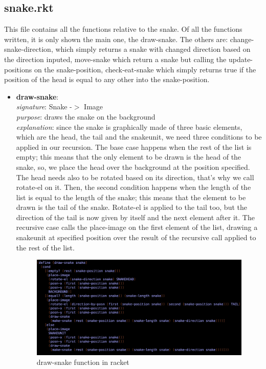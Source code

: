 \documentclass{article}
\begin{document}
	\pagebreak
	
	\subsection{snake.rkt}
	This file contains all the functions relative to the snake. Of all the functions written, it is only shown the main one, the draw-snake. The others are: change-snake-direction, which simply returns a snake with changed direction based on the direction inputed, move-snake which return a snake but calling the update-positions on the snake-position, check-eat-snake which simply returns true if the position of the head is equal to any other into the snake-position.
	\begin{itemize}
		\item \textbf{draw-snake}: \\
			\emph{signature}: Snake -$>$ Image \\
			\emph{purpose}: draws the snake on the background \\
			\emph{explanation}: since the snake is graphically made of three basic elements, which are the head, the tail and the snakeunit, we need three conditions to be applied in our recursion. The base case happens when the rest of the list is empty; this means that the only element to be drawn is the head of the snake, so, we place the head over the background at the position specified. The head needs also to be rotated based on its direction, that's why we call rotate-el on it. Then, the second condition happens when the length of the list is equal to the length of the snake; this means that the element to be drawn is the tail of the snake. Rotate-el is applied to the tail too, but the direction of the tail is now given by itself and the next element after it. The recursive case calls the place-image on the first element of the list, drawing a snakeunit at specified position over the result of the recursive call applied to the rest of the list.  
			\begin{figure}[h!]
				\centering
				\includegraphics[width=.6\linewidth]{draw-snake.png}
				\caption{draw-snake function in racket}
			\end{figure}
	\end{itemize}
	
\end{document}
